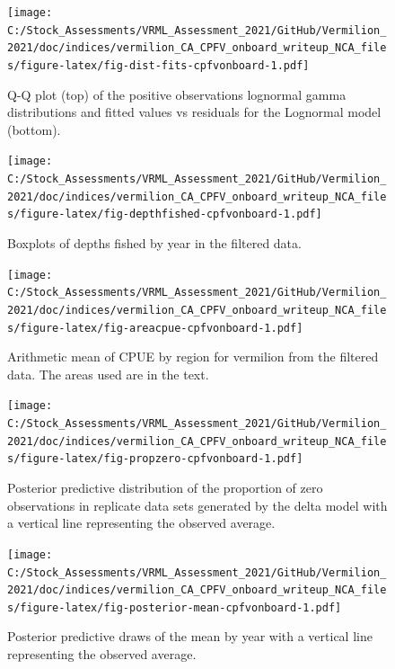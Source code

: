 \documentclass[11pt,
  english,
  a4paper,
]{article}
\begin{document}
\FloatBarrier

\begin{figure}
\centering
\texttt{[image: C:/Stock\_Assessments/VRML\_Assessment\_2021/GitHub/Vermilion\_2021/doc/indices/vermilion\_CA\_CPFV\_onboard\_writeup\_NCA\_files/figure-latex/fig-dist-fits-cpfvonboard-1.pdf]}
\caption{\label{fig:fig-dist-fits-cpfvonboard}Q-Q plot (top) of the positive observations lognormal gamma distributions and fitted values vs residuals for the Lognormal model (bottom).}
\end{figure}

\begin{figure}
\centering
\texttt{[image: C:/Stock\_Assessments/VRML\_Assessment\_2021/GitHub/Vermilion\_2021/doc/indices/vermilion\_CA\_CPFV\_onboard\_writeup\_NCA\_files/figure-latex/fig-depthfished-cpfvonboard-1.pdf]}
\caption{\label{fig:fig-depthfished-cpfvonboard}Boxplots of depths fished by year in the filtered data.}
\end{figure}

\begin{figure}
\centering
\texttt{[image: C:/Stock\_Assessments/VRML\_Assessment\_2021/GitHub/Vermilion\_2021/doc/indices/vermilion\_CA\_CPFV\_onboard\_writeup\_NCA\_files/figure-latex/fig-areacpue-cpfvonboard-1.pdf]}
\caption{\label{fig:fig-areacpue-cpfvonboard}Arithmetic mean of CPUE by region for vermilion from the filtered data. The areas used are in the text.}
\end{figure}

\begin{figure}
\centering
\texttt{[image: C:/Stock\_Assessments/VRML\_Assessment\_2021/GitHub/Vermilion\_2021/doc/indices/vermilion\_CA\_CPFV\_onboard\_writeup\_NCA\_files/figure-latex/fig-propzero-cpfvonboard-1.pdf]}
\caption{\label{fig:fig-propzero-cpfvonboard}Posterior predictive distribution of the proportion of zero observations in replicate data sets generated by the delta model with a vertical line representing the observed average.}
\end{figure}

\begin{figure}
\centering
\texttt{[image: C:/Stock\_Assessments/VRML\_Assessment\_2021/GitHub/Vermilion\_2021/doc/indices/vermilion\_CA\_CPFV\_onboard\_writeup\_NCA\_files/figure-latex/fig-posterior-mean-cpfvonboard-1.pdf]}
\caption{\label{fig:fig-posterior-mean-cpfvonboard}Posterior predictive draws of the mean by year with a vertical line representing the observed average.}
\end{figure}
\end{document}
